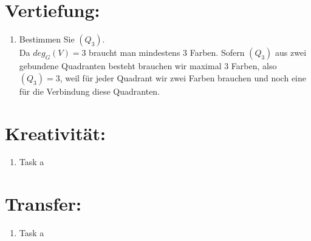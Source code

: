 

\usepackage{ tipa }


    \maketitle
    \section*{Vertiefung:}
    \begin{enumerate}[label=(\alph*)]
        \item Bestimmen Sie \textchi$(Q_3 )$.\\
        Da $deg_G(V) = 3 $ braucht man mindestens 3 Farben. Sofern $(Q_3)$ aus zwei gebundene Quadranten besteht brauchen wir maximal 3 Farben, also \textchi$(Q_3) = 3$, weil für jeder Quadrant wir zwei Farben brauchen und noch eine für die Verbindung diese Quadranten.
    \end{enumerate}
    \section*{Kreativität:}
    \begin{enumerate}[label=(\alph*)]
    	\item Task a
    \end{enumerate}
    \section*{Transfer:}
    \begin{enumerate}[label=(\alph*)]
    	\item Task a
    \end{enumerate}








